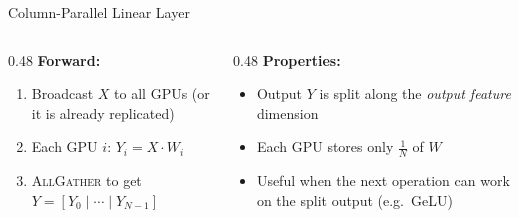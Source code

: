 \begin{frame}{Column-Parallel Linear Layer}
  \begin{columns}
    \begin{column}{0.48\textwidth}
      \textbf{Forward:}
      \begin{enumerate}
        \item Broadcast $X$ to all GPUs (or it is already replicated)
        \item Each GPU $i$: $Y_i = X \cdot W_i$
        \item \textsc{AllGather} to get $Y = [Y_0 \mid \cdots \mid Y_{N-1}]$
      \end{enumerate}
    \end{column}
    \begin{column}{0.48\textwidth}
      \textbf{Properties:}
      \begin{itemize}
        \item Output $Y$ is split along the \emph{output feature} dimension
        \item Each GPU stores only $\frac{1}{N}$ of $W$
        \item Useful when the next operation can work on the split output (e.g.\ GeLU)
      \end{itemize}
    \end{column}
  \end{columns}
\end{frame}


